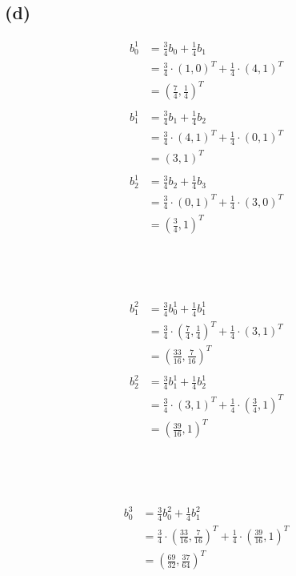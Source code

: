 \documentclass{article}
\begin{document}
\subsection*{(d)}
\[
    \begin{aligned}
        b_{0}^{1} &= \frac{3}{4} b_{0} + \frac{1}{4} b_{1} \\
        &= \frac{3}{4} \cdot (1,0)^T + \frac{1}{4} \cdot (4,1)^T \\
        &= \left(\frac{7}{4}, \frac{1}{4}\right)^T \\
        & \\
        b_{1}^{1} &= \frac{3}{4} b_{1} + \frac{1}{4} b_{2} \\
        &= \frac{3}{4} \cdot (4,1)^T + \frac{1}{4} \cdot (0,1)^T \\
        &= \left(3,1\right)^T \\
        & \\
        b_{2}^{1} &= \frac{3}{4} b_{2} + \frac{1}{4} b_{3} \\
        &= \frac{3}{4} \cdot (0,1)^T + \frac{1}{4} \cdot (3,0)^T \\
        &= \left(\frac{3}{4}, 1\right)^T
    \end{aligned}
\]
\\
\\
\\
\\
\[
    \begin{aligned}
        b_{1}^{2} &= \frac{3}{4} b_{0}^{1} + \frac{1}{4} b_{1}^{1} \\
        &= \frac{3}{4} \cdot \left(\frac{7}{4}, \frac{1}{4}\right)^T + \frac{1}{4} \cdot \left(3,1\right)^T \\
        &= \left(\frac{33}{16}, \frac{7}{16}\right)^T \\
        & \\
        b_{2}^{2} &= \frac{3}{4} b_{1}^{1} + \frac{1}{4} b_{2}^{1} \\
        &= \frac{3}{4} \cdot \left(3,1\right)^T + \frac{1}{4} \cdot \left(\frac{3}{4}, 1\right)^T \\
        &= \left(\frac{39}{16}, 1\right)^T
    \end{aligned}
\]
\\
\\
\\
\\
\[
    \begin{aligned}
        b_{0}^{3} &= \frac{3}{4} b_{0}^{2} + \frac{1}{4} b_{1}^{2} \\
        &= \frac{3}{4} \cdot \left(\frac{33}{16}, \frac{7}{16}\right)^T + \frac{1}{4} \cdot \left(\frac{39}{16}, 1\right)^T \\
        &= \left(\frac{69}{32}, \frac{37}{64}\right)^T
    \end{aligned}
\]
\end{document}
